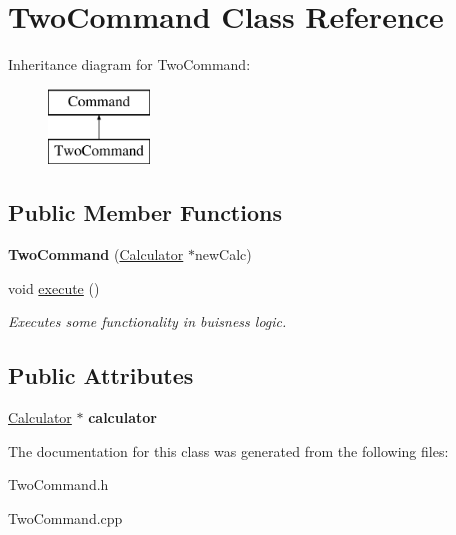 \hypertarget{class_two_command}{}\section{Two\+Command Class Reference}
\label{class_two_command}
Inheritance diagram for Two\+Command\+:\begin{figure}[H]
\begin{center}
\leavevmode
\includegraphics[height=2.000000cm]{class_two_command}
\end{center}
\end{figure}
\subsection*{Public Member Functions}
\begin{DoxyCompactItemize}
\item 
\hypertarget{class_two_command_a73335d14fe98bc82ef181647b5541aea}{}{\bfseries Two\+Command} (\hyperlink{class_calculator}{Calculator} $\ast$new\+Calc)\label{class_two_command_a73335d14fe98bc82ef181647b5541aea}

\item 
\hypertarget{class_two_command_a5065cc2a07c69dcba178c82d7610e29f}{}void \hyperlink{class_two_command_a5065cc2a07c69dcba178c82d7610e29f}{execute} ()\label{class_two_command_a5065cc2a07c69dcba178c82d7610e29f}

\begin{DoxyCompactList}\small\item\em Executes some functionality in buisness logic. \end{DoxyCompactList}\end{DoxyCompactItemize}
\subsection*{Public Attributes}
\begin{DoxyCompactItemize}
\item 
\hypertarget{class_two_command_a0242384aa6f8091cc5c413d4e4763cf9}{}\hyperlink{class_calculator}{Calculator} $\ast$ {\bfseries calculator}\label{class_two_command_a0242384aa6f8091cc5c413d4e4763cf9}

\end{DoxyCompactItemize}


The documentation for this class was generated from the following files\+:\begin{DoxyCompactItemize}
\item 
Two\+Command.\+h\item 
Two\+Command.\+cpp\end{DoxyCompactItemize}
